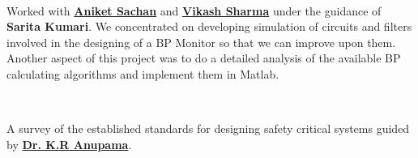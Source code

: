 \documentclass[letterpaper]{deedy-resume} %
\begin{document}
\begin{minipage}[t]{0.74\textwidth}
 \\
\begin{tightitemize}
\item[] Worked with \textbf{\href{http://in.linkedin.com/in/aniketsachan}{Aniket Sachan}} and \textbf{\href{http://in.linkedin.com/pub/vikash-sharma/16/865/aba}{Vikash Sharma}} under the guidance of \textbf{Sarita Kumari}. We concentrated on developing simulation of circuits and filters involved in the designing of a BP Monitor so that we can improve upon them. Another aspect of this project was to do a detailed analysis of the available BP calculating algorithms and implement them in Matlab.
\end{tightitemize}

\sectionspace %


 \\
\begin{tightitemize}
\item[] A survey of the established standards for designing safety critical systems guided by \textbf{\href{http://universe.bits-pilani.ac.in/goa/anupkr/profile}{Dr. K.R Anupama}}.
\end{tightitemize}

\sectionspace %


\end{minipage} %



\end{document}
